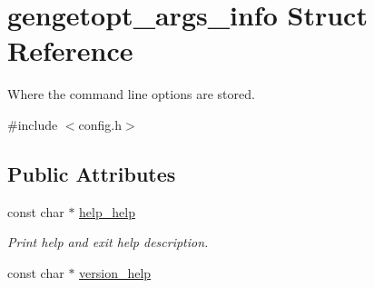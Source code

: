 \hypertarget{structgengetopt__args__info}{}\section{gengetopt\+\_\+args\+\_\+info Struct Reference}
\label{structgengetopt__args__info}


Where the command line options are stored.  




{\ttfamily \#include $<$config.\+h$>$}

\subsection*{Public Attributes}
\begin{DoxyCompactItemize}
\item 
\hypertarget{structgengetopt__args__info_a6497d9a5edee41da66eb109f093781a7}{}const char $\ast$ \hyperlink{structgengetopt__args__info_a6497d9a5edee41da66eb109f093781a7}{help\+\_\+help}\label{structgengetopt__args__info_a6497d9a5edee41da66eb109f093781a7}

\begin{DoxyCompactList}\small\item\em Print help and exit help description. \end{DoxyCompactList}\item 
\hypertarget{structgengetopt__args__info_adb4fc9ee66c499d4225d6f6eefbd8c09}{}const char $\ast$ \hyperlink{structgengetopt__args__info_adb4fc9ee66c499d4225d6f6eefbd8c09}{version\+\_\+help}\label{structgengetopt__args__info_adb4fc9ee66c499d4225d6f6eefbd8c09}


\end{DoxyCompactItemize}

